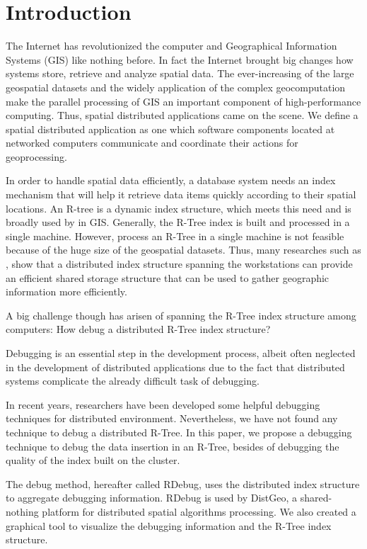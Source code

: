 \section{Introduction}
\label{sec:intro}

The Internet has revolutionized the computer and Geographical Information Systems (GIS) like nothing before. In fact the Internet brought big changes how systems store, retrieve and analyze spatial data. The ever-increasing of the large geospatial datasets and the widely application of the complex geocomputation make the parallel processing of GIS an important component of high-performance computing. Thus, spatial distributed applications came on the scene. We define a spatial distributed application as one which software components located at networked computers communicate and coordinate their actions for geoprocessing.

In order to handle spatial data efficiently, a database system needs an index mechanism that will help it retrieve data items quickly according to their spatial locations. An R-tree is a dynamic index structure, which meets this need and is broadly used by in GIS. Generally, the R-Tree index is built and processed in a single machine. However, process an R-Tree in a single machine is not feasible because of the huge size of the geospatial datasets. Thus, many researches such as  \cite{an1999storing,dedsi,zhong2012towards}, show that a distributed index structure spanning the workstations can provide an efficient shared storage structure that can be used to gather geographic information more efficiently.

A big challenge though has arisen of spanning the R-Tree index structure among computers: How debug a distributed R-Tree index structure? 

Debugging is an essential step in the development process, albeit often neglected in the development of distributed applications due to the fact that distributed systems complicate the already difficult task of debugging.

In recent years, researchers have been developed some helpful debugging techniques for distributed environment. Nevertheless, we have not found any technique to debug a distributed R-Tree. In this paper, we propose a debugging technique to debug the data insertion in an R-Tree, besides of debugging the quality of the index built on the cluster.

The debug method, hereafter called RDebug, uses the distributed index structure to aggregate debugging information. RDebug is used by DistGeo, a shared-nothing platform for distributed spatial algorithms processing. We also created a graphical tool to visualize the debugging information and the R-Tree index structure. 


